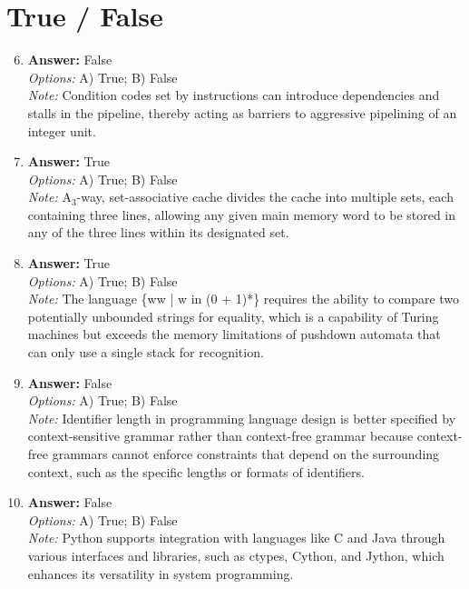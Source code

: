 \documentclass[12pt]{article}
\begin{document}
\section*{True / False}
\begin{enumerate}[label=\arabic*.]
\setcounter{enumi}{5}
\item \textbf{Answer:} False
\\ \textit{Options:} A) True; B) False
\\ \textit{Note:} Condition codes set by instructions can introduce dependencies and stalls in the pipeline, thereby acting as barriers to aggressive pipelining of an integer unit.
\item \textbf{Answer:} True
\\ \textit{Options:} A) True; B) False
\\ \textit{Note:} A$_{3}$-way, set-associative cache divides the cache into multiple sets, each containing three lines, allowing any given main memory word to be stored in any of the three lines within its designated set.
\item \textbf{Answer:} True
\\ \textit{Options:} A) True; B) False
\\ \textit{Note:} The language \{ww | w in (0 + 1)*\} requires the ability to compare two potentially unbounded strings for equality, which is a capability of Turing machines but exceeds the memory limitations of pushdown automata that can only use a single stack for recognition.
\item \textbf{Answer:} False
\\ \textit{Options:} A) True; B) False
\\ \textit{Note:} Identifier length in programming language design is better specified by context-sensitive grammar rather than context-free grammar because context-free grammars cannot enforce constraints that depend on the surrounding context, such as the specific lengths or formats of identifiers.
\item \textbf{Answer:} False
\\ \textit{Options:} A) True; B) False
\\ \textit{Note:} Python supports integration with languages like C and Java through various interfaces and libraries, such as ctypes, Cython, and Jython, which enhances its versatility in system programming.
\end{enumerate}
\end{document}
